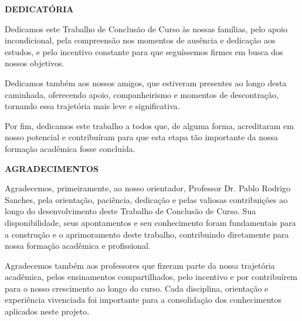 \newpage
\thispagestyle{empty}
\begin{center}
    \fontsize{14pt}{14pt}\selectfont\bfseries DEDICATÓRIA\\[24pt]
\end{center}

Dedicamos este Trabalho de Conclusão de Curso às nossas famílias, pelo apoio incondicional, pela compreensão nos momentos de ausência e dedicação aos estudos, e pelo incentivo constante para que seguíssemos firmes em busca dos nossos objetivos.

Dedicamos também aos nossos amigos, que estiveram presentes ao longo desta caminhada, oferecendo apoio, companheirismo e momentos de descontração, tornando essa trajetória mais leve e significativa.

Por fim, dedicamos este trabalho a todos que, de alguma forma, acreditaram em nosso potencial e contribuíram para que esta etapa tão importante da nossa formação acadêmica fosse concluída.

\newpage
\thispagestyle{empty}
\begin{center}
    \fontsize{14pt}{14pt}\selectfont\bfseries AGRADECIMENTOS\\[24pt]
\end{center}

Agradecemos, primeiramente, ao nosso orientador, Professor Dr. Pablo Rodrigo Sanches, pela orientação, paciência, dedicação e pelas valiosas contribuições ao longo do desenvolvimento deste Trabalho de Conclusão de Curso. Sua disponibilidade, seus apontamentos e seu conhecimento foram fundamentais para a construção e o aprimoramento deste trabalho, contribuindo diretamente para nossa formação acadêmica e profissional.

Agradecemos também aos professores que fizeram parte da nossa trajetória acadêmica, pelos ensinamentos compartilhados, pelo incentivo e por contribuírem para o nosso crescimento ao longo do curso. Cada disciplina, orientação e experiência vivenciada foi importante para a consolidação dos conhecimentos aplicados neste projeto.

